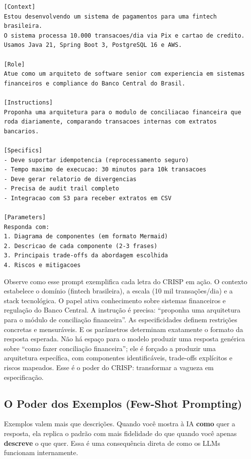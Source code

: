 \begin{lstlisting}[language={}, caption={Exemplo de prompt usando o framework CRISP}]
[Context]
Estou desenvolvendo um sistema de pagamentos para uma fintech brasileira.
O sistema processa 10.000 transacoes/dia via Pix e cartao de credito.
Usamos Java 21, Spring Boot 3, PostgreSQL 16 e AWS.

[Role]
Atue como um arquiteto de software senior com experiencia em sistemas
financeiros e compliance do Banco Central do Brasil.

[Instructions]
Proponha uma arquitetura para o modulo de conciliacao financeira que
roda diariamente, comparando transacoes internas com extratos bancarios.

[Specifics]
- Deve suportar idempotencia (reprocessamento seguro)
- Tempo maximo de execucao: 30 minutos para 10k transacoes
- Deve gerar relatorio de divergencias
- Precisa de audit trail completo
- Integracao com S3 para receber extratos em CSV

[Parameters]
Responda com:
1. Diagrama de componentes (em formato Mermaid)
2. Descricao de cada componente (2-3 frases)
3. Principais trade-offs da abordagem escolhida
4. Riscos e mitigacoes
\end{lstlisting}

Observe como esse prompt exemplifica cada letra do CRISP em ação. O contexto
estabelece o domínio (fintech brasileira), a escala (10 mil transações/dia) e a
stack tecnológica. O papel ativa conhecimento sobre sistemas financeiros e
regulação do Banco Central. A instrução é precisa: ``proponha uma arquitetura para
o módulo de conciliação financeira''. As especificidades definem restrições
concretas e mensuráveis. E os parâmetros determinam exatamente o formato da
resposta esperada. Não há espaço para o modelo produzir uma resposta genérica
sobre ``como fazer conciliação financeira''; ele é forçado a produzir uma
arquitetura específica, com componentes identificáveis, trade-offs explícitos e
riscos mapeados. Esse é o poder do CRISP: transformar a vagueza em especificação.

\subsection{O Poder dos Exemplos (Few-Shot Prompting)}

Exemplos valem mais que descrições. Quando você mostra à IA \textbf{como} quer
a resposta, ela replica o padrão com mais fidelidade do que quando você apenas
\textbf{descreve} o que quer. Essa é uma consequência direta de como os LLMs
funcionam internamente.

